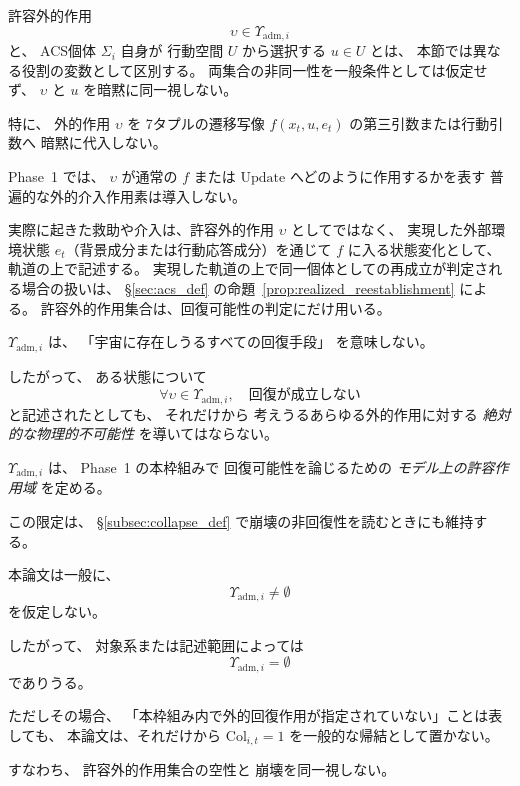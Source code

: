 \begin{remark}
\label{rem:external_action_type}
許容外的作用
\[
  \upsilon\in\Upsilon_{\mathrm{adm},i}
\]
と、
ACS個体 $\Sigma_i$ 自身が
行動空間 $U$ から選択する
$u\in U$
とは、
本節では異なる役割の変数として区別する。
両集合の非同一性を一般条件としては仮定せず、
$\upsilon$ と $u$ を暗黙に同一視しない。

特に、
外的作用 $\upsilon$ を
7タプルの遷移写像
$f(x_t,u,e_t)$
の第三引数または行動引数へ
暗黙に代入しない。

Phase~1 では、
$\upsilon$ が通常の
$f$ または $\mathrm{Update}$
へどのように作用するかを表す
普遍的な外的介入作用素は導入しない。

実際に起きた救助や介入は、許容外的作用 $\upsilon$ としてではなく、
実現した外部環境状態 $e_t$（背景成分または行動応答成分）を通じて
$f$ に入る状態変化として、軌道の上で記述する。
実現した軌道の上で同一個体としての再成立が判定される場合の扱いは、
\S\ref{sec:acs_def} の命題~\ref{prop:realized_reestablishment} による。
許容外的作用集合は、回復可能性の判定にだけ用いる。
\end{remark}

\begin{remark}
\label{rem:Upsilon_adm_scope}
$\Upsilon_{\mathrm{adm},i}$ は、
「宇宙に存在しうるすべての回復手段」
を意味しない。

したがって、
ある状態について
\[
  \forall\upsilon\in\Upsilon_{\mathrm{adm},i},
  \quad
  \text{回復が成立しない}
\]
と記述されたとしても、
それだけから
考えうるあらゆる外的作用に対する
\emph{絶対的な物理的不可能性}
を導いてはならない。

$\Upsilon_{\mathrm{adm},i}$ は、
Phase~1 の本枠組みで
回復可能性を論じるための
\emph{モデル上の許容作用域}
を定める。

この限定は、
\S\ref{subsec:collapse_def}
で崩壊の非回復性を読むときにも維持する。
\end{remark}

\begin{remark}
\label{rem:Upsilon_adm_empty}
本論文は一般に、
\[
  \Upsilon_{\mathrm{adm},i}\neq\emptyset
\]
を仮定しない。

したがって、
対象系または記述範囲によっては
\[
  \Upsilon_{\mathrm{adm},i}=\emptyset
\]
でありうる。

ただしその場合、
「本枠組み内で外的回復作用が指定されていない」ことは表しても、
本論文は、それだけから
$\mathrm{Col}_{i,t}=1$
を一般的な帰結として置かない。

すなわち、
許容外的作用集合の空性と
崩壊を同一視しない。
\end{remark}

